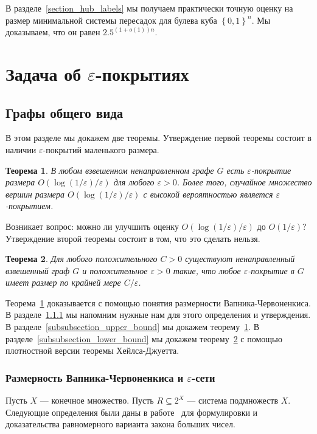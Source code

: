 \documentclass[12pt]{article}
\newcommand{\eps}{\varepsilon}
\newcommand{\set}[1]{\left\{#1\right\}}
\newcommand{\zo}{\set{0, 1}}
\newtheorem{theorem}{Теорема}
\begin{document}
    В разделе~\ref{section_hub_labels} мы получаем практически точную оценку на размер минимальной системы пересадок
    для булева куба $\zo^n$. Мы доказываем, что он равен $2.5^{(1 + o(1)) n}$.
    \section{Задача об $\eps$-покрытиях}
    \label{section_eps_covers}
    \subsection{Графы общего вида}
    \label{subsection_general_graphs}
    В этом разделе мы докажем две теоремы.
    Утверждение первой теоремы состоит в наличии $\eps$-покрытий маленького размера.
    \begin{theorem}
        \label{upper_bound}
        В любом взвешенном ненаправленном графе $G$ есть $\eps$-покрытие размера $O(\log(1 / \eps) / \eps)$ для
        любого $\eps > 0$. Более того, случайное множество вершин размера $O(\log(1 / \eps) / \eps)$ с высокой вероятностью
        является $\eps$-покрытием.
    \end{theorem}
    Возникает вопрос: можно ли улучшить оценку $O(\log(1 / \eps) / \eps)$ до $O(1 / \eps)$? Утверждение второй теоремы
    состоит в том, что это сделать нельзя.
    \begin{theorem}
        \label{lower_bound}
        Для любого положительного $C > 0$ существуют ненаправленный взвешенный граф $G$ и положительное $\eps > 0$
        такие, что любое $\eps$-покрытие в $G$ имеет размер по крайней мере $C / \eps$.
    \end{theorem}
    Теорема~\ref{upper_bound} доказывается с помощью понятия размерности Вапника-Червоненкиса. В
    разделе~\ref{subsubsection_vapnik_chervonenkis} мы напомним нужные нам для этого определения и утверждения.
    В разделе~\ref{subsubsection_upper_bound} мы докажем теорему~\ref{upper_bound}.
    В разделе~\ref{subsubsection_lower_bound} мы докажем теорему~\ref{lower_bound} с помощью
    плотностной версии теоремы Хейлса-Джуетта.
    \subsubsection{Размерность Вапника-Червоненкиса и $\eps$-сети}
    \label{subsubsection_vapnik_chervonenkis}

    Пусть $X$ --- конечное множество. Пусть $R \subseteq 2^X$ --- система подмножеств $X$.
    Следующие определения были даны в работе~\cite{VC71} для формулировки и доказательства равномерного варианта
    закона больших чисел.
\end{document}
